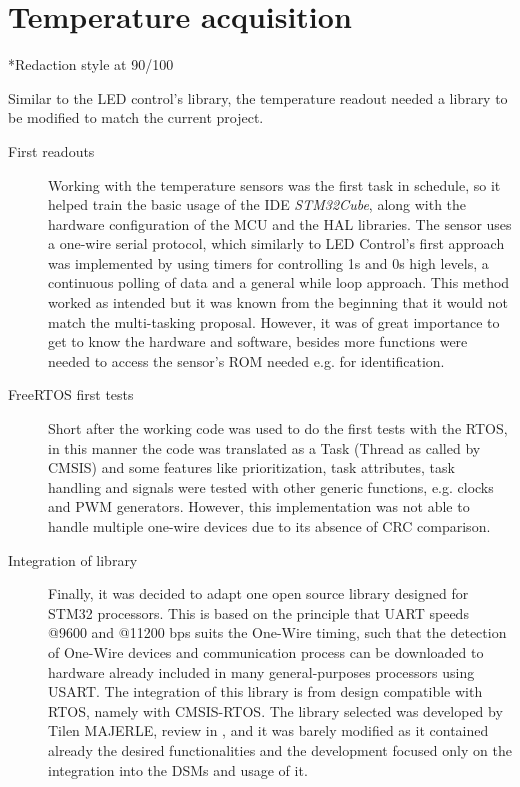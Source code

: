\section{Temperature acquisition}\label{sec:temperature}
*Redaction style at 90/100

Similar to the LED control's library, the temperature readout needed a library to be modified to match the current project.
\begin{description}
\item[First readouts] Working with the temperature sensors was the first task in schedule, so it helped train the basic usage
    of the IDE \emph{STM32Cube}, along with the hardware configuration of the MCU and the HAL libraries. 
    The sensor uses a one-wire serial protocol, which similarly to LED Control's first approach was implemented by using 
    timers for controlling 1s and 0s high levels, a continuous polling of data and a general while loop approach. 
    This method worked as intended but it was known from the beginning that it would not match the multi-tasking proposal. 
    However, it was of great importance to get to know the hardware and software, besides more functions were needed to 
    access the sensor's ROM needed e.g. for identification.
\item[FreeRTOS first tests] Short after the working code was used to do the first tests with the RTOS, 
    in this manner the code was translated as a Task (Thread as called by CMSIS) and some features like prioritization, 
    task attributes, task handling and signals were tested with other generic functions, e.g. clocks and PWM generators. 
    However, this implementation was not able to handle multiple one-wire devices due to its absence of CRC comparison.
\item[Integration of library] Finally, it was decided to adapt one open source library designed for STM32 processors. 
    This is based on the principle that UART speeds @9600 and @11200 bps suits the One-Wire timing, such that the 
    detection of One-Wire devices and communication process can be downloaded to hardware already included in many 
    general-purposes processors using USART. The integration of this library is from design compatible with RTOS, 
    namely with CMSIS-RTOS. The library selected was developed by Tilen MAJERLE, review in \cite{temp_library}, and it 
    was barely modified as it contained already the desired functionalities and the development
    focused only on the integration into the DSMs and usage of it. 
\end{description}

